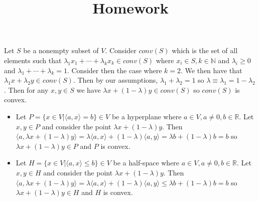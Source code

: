 \documentclass[12pt]{article}
\title{Homework}
\newcommand{\N}{\mathbb{N}}
\newcommand{\R}{\mathbb{R}}
\newenvironment{problem}[2][Problem]{\begin{trivlist}
\item[\hskip \labelsep {\bfseries #1}\hskip \labelsep {\bfseries #2}]}{\end{trivlist}}
\begin{document}
\begin{problem}{1.}
Let $S$ be a nonempty subset of $V$. Consider $conv(S)$ which is the set of all elements such that $\lambda_1x_1 + \cdots + \lambda_kx_k \in conv(S)$ where $x_i \in S, k \in \N$ and $\lambda_i \geq 0$ and $\lambda_1 + \cdots + \lambda_k = 1$. Consider then the case where $k=2$. We then have that $\lambda_1x + \lambda_2 y \in conv(S)$. Then by our assumptions, $\lambda_1 + \lambda_2 = 1$ so $\lambda \equiv \lambda_1 = 1- \lambda_2$. Then for any $x,y \in S$ we have $\lambda x + (1-\lambda)y \in conv(S)$ so $conv(S)$ is convex. 
\end{problem}

\begin{problem}{2.}\hfill
\begin{itemize}
\item[(i)] Let $P = \{x \in V | \langle a, x \rangle = b\} \in V$ be a hyperplane where $a \in V, a \neq 0, b\in \R$. Let $x, y \in P$ and consider the point $\lambda x + (1-\lambda)y$. Then $\langle a, \lambda x + (1-\lambda)y \rangle = \lambda \langle a, x \rangle + (1-\lambda)\langle a, y \rangle = \lambda b + (1-\lambda)b = b$ so $\lambda x + (1-\lambda)y \in P$ and $P$ is convex. 
\item[(ii)]Let $H = \{x \in V | \langle a, x \rangle \leq b\} \in V$ be a half-space where $a \in V, a \neq 0, b\in \R$. Let $x, y \in H$ and consider the point $\lambda x + (1-\lambda)y$. Then  $\langle a, \lambda x + (1-\lambda)y \rangle = \lambda \langle a, x \rangle + (1-\lambda)\langle a, y \rangle \leq \lambda b + (1-\lambda)b = b$ so $\lambda x + (1-\lambda)y \in H$ and $H$ is convex. 
\end{itemize}
\end{problem}
\end{document}
